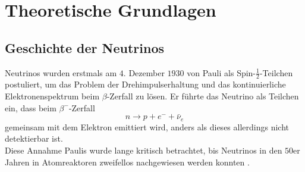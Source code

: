 \chapter{Theoretische Grundlagen}
\label{chap:theorie}


\section{Geschichte der Neutrinos}
\label{sec:neutrinogeschichte}

Neutrinos wurden erstmals am $4.$ Dezember $1930$ von Pauli als Spin-$\frac{1}{2}$-Teilchen postuliert, um das Problem der Drehimpulserhaltung und das kontinuierliche Elektronenspektrum beim $\beta$-Zerfall zu lösen. %
Er führte das Neutrino als Teilchen ein, dass beim $\beta^-$-Zerfall
\begin{equation*}
    n \rightarrow p + e^- + \bar{\nu}_e
\end{equation*}
gemeinsam mit dem Elektron emittiert wird, anders als dieses allerdings nicht detektierbar ist. \\
Diese Annahme Paulis wurde lange kritisch betrachtet, bis Neutrinos in den $50$er Jahren in Atomreaktoren zweifellos nachgewiesen werden konnten \cite{zuber}.

